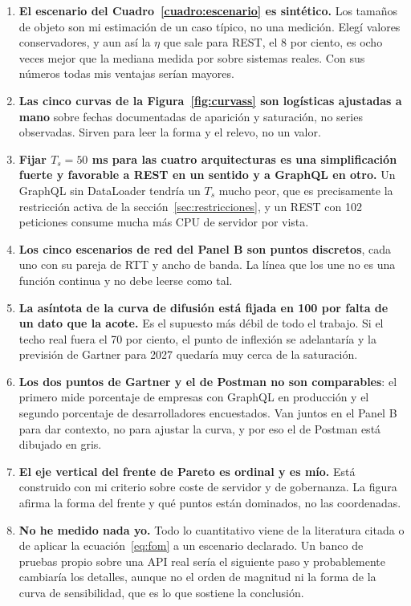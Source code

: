 \documentclass[11pt,letterpaper]{article}
\begin{document}
\begin{enumerate}
\item \textbf{El escenario del Cuadro~\ref{cuadro:escenario} es sintético.} Los
  tamaños de objeto son mi estimación de un caso típico, no una medición. Elegí
  valores conservadores, y aun así la $\eta$ que sale para REST, el 8 por
  ciento, es ocho veces mejor que la mediana medida por
  \textcite{brito2019} sobre sistemas reales. Con sus números todas mis
  ventajas serían mayores.
\item \textbf{Las cinco curvas de la Figura~\ref{fig:curvass} son logísticas
  ajustadas a mano} sobre fechas documentadas de aparición y saturación, no
  series observadas. Sirven para leer la forma y el relevo, no un valor.
\item \textbf{Fijar $T_{s} = 50$ ms para las cuatro arquitecturas es una
  simplificación fuerte y favorable a REST en un sentido y a GraphQL en otro.}
  Un GraphQL sin DataLoader tendría un $T_{s}$ mucho peor, que es precisamente
  la restricción activa de la sección~\ref{sec:restricciones}, y un REST con
  102 peticiones consume mucha más CPU de servidor por vista.
\item \textbf{Los cinco escenarios de red del Panel B son puntos discretos},
  cada uno con su pareja de RTT y ancho de banda. La línea que los une no es
  una función continua y no debe leerse como tal.
\item \textbf{La asíntota de la curva de difusión está fijada en 100 por
  falta de un dato que la acote.} Es el supuesto más débil de todo el trabajo.
  Si el techo real fuera el 70 por ciento, el punto de inflexión se adelantaría
  y la previsión de Gartner para 2027 quedaría muy cerca de la saturación.
\item \textbf{Los dos puntos de Gartner y el de Postman no son comparables}: el
  primero mide porcentaje de empresas con GraphQL en producción y el segundo
  porcentaje de desarrolladores encuestados. Van juntos en el Panel B para dar
  contexto, no para ajustar la curva, y por eso el de Postman está dibujado en
  gris.
\item \textbf{El eje vertical del frente de Pareto es ordinal y es mío.} Está
  construido con mi criterio sobre coste de servidor y de gobernanza. La figura
  afirma la forma del frente y qué puntos están dominados, no las coordenadas.
\item \textbf{No he medido nada yo.} Todo lo cuantitativo viene de la
  literatura citada o de aplicar la ecuación~\eqref{eq:fom} a un escenario
  declarado. Un banco de pruebas propio sobre una API real sería el siguiente
  paso y probablemente cambiaría los detalles, aunque no el orden de magnitud
  ni la forma de la curva de sensibilidad, que es lo que sostiene la
  conclusión.
\end{enumerate}

\printbibliography
\end{document}
